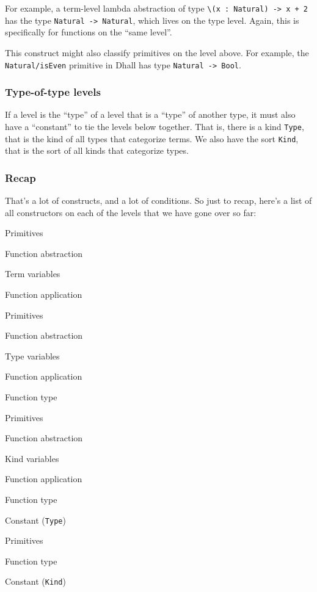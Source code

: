 \documentclass[]{article}
\begin{document}
For example, a term-level lambda abstraction of type
\texttt{\textbackslash{}(x\ :\ Natural)\ -\textgreater{}\ x\ +\ 2} has the type
\texttt{Natural\ -\textgreater{}\ Natural}, which lives on the type level.
Again, this is specifically for functions on the ``same level''.

This construct might also classify primitives on the level above. For example,
the \texttt{Natural/isEven} primitive in Dhall has type
\texttt{Natural\ -\textgreater{}\ Bool}.

\subsubsection{Type-of-type levels}\label{type-of-type-levels}

If a level is the ``type'' of a level that is a ``type'' of another type, it
must also have a ``constant'' to tie the levels below together. That is, there
is a kind \texttt{Type}, that is the kind of all types that categorize terms. We
also have the sort \texttt{Kind}, that is the sort of all kinds that categorize
types.

\subsubsection{Recap}\label{recap}

That's a lot of constructs, and a lot of conditions. So just to recap, here's a
list of all constructors on each of the levels that we have gone over so far:

\begin{description}
\tightlist
\item[Term]
Primitives

Function abstraction

Term variables

Function application
\item[Type]
Primitives

Function abstraction

Type variables

Function application

Function type
\item[Kind]
Primitives

Function abstraction

Kind variables

Function application

Function type

Constant (\texttt{Type})
\item[Sort]
Primitives

Function type

Constant (\texttt{Kind})
\end{description}
\end{document}
